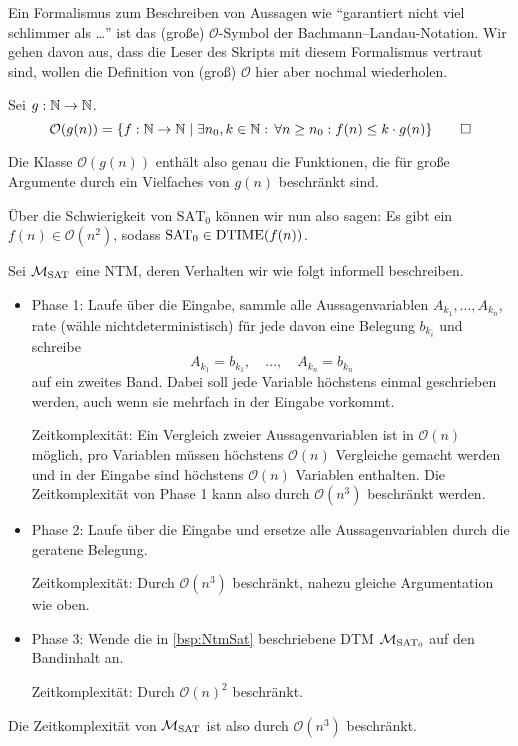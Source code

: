 Ein Formalismus zum Beschreiben von Aussagen wie "`garantiert nicht viel schlimmer als \dots"'
ist das (große) $\mathcal{O}$-Symbol der Bachmann–Landau-Notation.
Wir gehen davon aus, dass die Leser des Skripts mit diesem Formalismus vertraut sind, wollen die Definition von (groß) $\mathcal{O}$ hier aber nochmal wiederholen.

\begin{Def} Sei $g:\mathbb{N}\rightarrow\mathbb{N}$.
\[ \mathcal{O}(g(n)) = \{f:\mathbb{N}\rightarrow\mathbb{N} \mid \exists n_0, k\in\mathbb{N}:\, \forall n\geq n_0: f(n)\leq k\cdot g(n)\} \qedhere \]
\end{Def}
Die Klasse $\mathcal{O}(g(n))$ enthält also genau die Funktionen, die für große Argumente durch ein Vielfaches von $g(n)$ beschränkt sind.

Über die Schwierigkeit von $\text{SAT}_0$ können wir nun also sagen:
Es gibt ein $f(n)\in\mathcal{O}(n^2)$, sodass $\text{SAT}_0\in\operatorname{DTIME}(f(n))$.

\begin{Bsp}\label{bsp:NtmSat}
Sei $\mathcal{M}_\text{SAT}$ eine \ac{NTM}, deren Verhalten wir wie folgt informell beschreiben.
\begin{itemize}
 \item Phase 1: Laufe über die Eingabe, sammle alle Aussagenvariablen $A_{k_1},\ldots,A_{k_n}$, rate (wähle nichtdeterministisch) für jede davon eine Belegung $b_{k_i}$ und schreibe
 $$A_{k_1}=b_{k_1},\quad\ldots,\quad A_{k_n}=b_{k_n}$$
 auf ein zweites Band.
 Dabei soll jede Variable höchstens einmal geschrieben werden, auch wenn sie mehrfach in der Eingabe vorkommt.
  
 Zeitkomplexität: 
 Ein Vergleich zweier Aussagenvariablen ist in $\mathcal{O}(n)$ möglich,
 pro Variablen müssen höchstens $\mathcal{O}(n)$ Vergleiche gemacht werden und
 in der Eingabe sind höchstens $\mathcal{O}(n)$ Variablen enthalten.
 Die Zeitkomplexität von Phase 1 kann also durch $\mathcal{O}(n^3)$ beschränkt werden.
 
 \item Phase 2: Laufe über die Eingabe und ersetze alle Aussagenvariablen durch die geratene Belegung.
 
 Zeitkomplexität: Durch $\mathcal{O}(n^3)$ beschränkt, nahezu gleiche Argumentation wie oben.
 
 \item Phase 3: Wende die in \autoref{bsp:NtmSat} beschriebene \ac{DTM} $\mathcal{M}_{\text{SAT}_0}$ auf den Bandinhalt an.
 
 Zeitkomplexität: Durch $\mathcal{O}(n)^2$ beschränkt.
\end{itemize}
Die Zeitkomplexität von $\mathcal{M}_\text{SAT}$ ist also durch $\mathcal{O}(n^3)$ beschränkt.
\end{Bsp}

